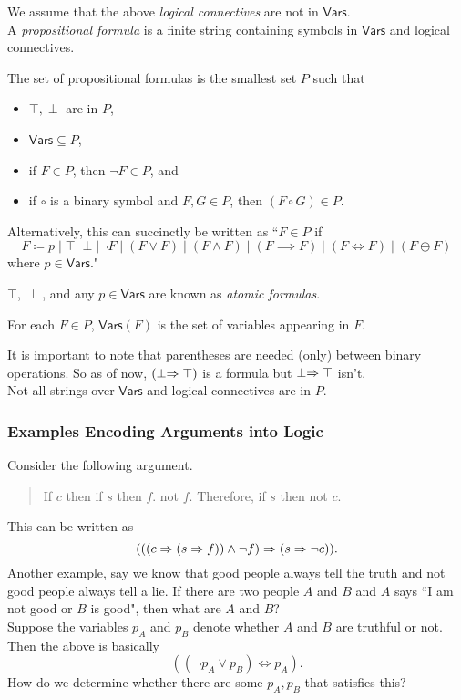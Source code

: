 We assume that the above \textit{logical connectives} are not in $\mathsf{Vars}$.\\
A \textit{propositional formula} is a finite string containing symbols in $\mathsf{Vars}$ and logical connectives.

\begin{definition}
The set of propositional formulas is the smallest set $P$ such that
\begin{itemize}
    \item $\top,\perp$ are in $P$,
    \item $\mathsf{Vars}\subseteq P$,
    \item if $F\in P$, then $\neg F\in P$, and
    \item if $\circ$ is a binary symbol and $F,G\in P$, then $(F\circ G)\in P$.
\end{itemize}
\end{definition}

Alternatively, this can succinctly be written as ``$F \in P$ if
\[F \coloneqq p\mid\top\mid\perp\mid \neg F \mid (F\vee F) \mid (F\wedge F) \mid (F\implies F) \mid (F\iff F) \mid (F\oplus F) \]
where $p\in\mathsf{Vars}$."

\begin{definition}
$\top$, $\perp$, and any $p\in\mathsf{Vars}$ are known as \textit{atomic formulas}.
\end{definition}

\begin{definition}
For each $F\in P$, $\mathsf{Vars}(F)$ is the set of variables appearing in $F$.
\end{definition}

It is important to note that parentheses are needed (only) between binary operations. So as of now, $(\perp\Rightarrow\top)$ is a formula but $\perp\Rightarrow\top$ isn't.\\
Not all strings over $\mathsf{Vars}$ and logical connectives are in $P$.

\subsubsection{Examples Encoding Arguments into Logic}

Consider the following argument.
\begin{quote}
    If $c$ then if $s$ then $f$. not $f$. Therefore, if $s$ then not $c$.
\end{quote}
This can be written as
\[ (((c\Rightarrow (s\Rightarrow f)) \wedge \neg f) \Rightarrow (s \Rightarrow \neg c)). \]
Another example, say we know that good people always tell the truth and not good people always tell a lie. If there are two people $A$ and $B$ and $A$ says ``I am not good or $B$ is good", then what are $A$ and $B$?\\
Suppose the variables $p_A$ and $p_B$ denote whether $A$ and $B$ are truthful or not. Then the above is basically
\[ ((\neg p_A \vee p_B) \iff p_A). \]
How do we determine whether there are some $p_A,p_B$ that satisfies this?

